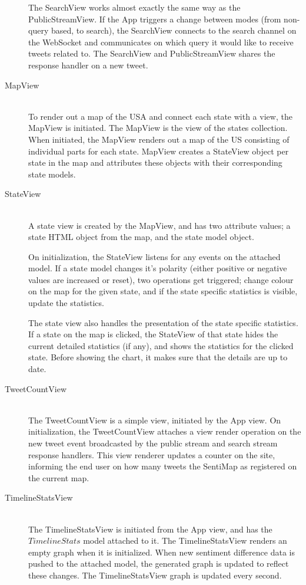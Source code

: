 \begin{description}
The SearchView works almost exactly the same way as the PublicStreamView. If the App triggers a change between modes (from non-query based, to search), the SearchView connects to the search channel on the WebSocket and communicates on which query it would like to receive tweets related to. The SearchView and PublicStreamView shares the response handler on a new tweet.

\item[MapView] \hfill \\

To render out a map of the USA and connect each state with a view, the MapView is initiated. The MapView is the view of the states collection. When initiated, the MapView renders out a map of the US consisting of individual parts for each state. MapView creates a StateView object per state in the map and attributes these objects with their corresponding state models.

\item[StateView] \hfill \\

A state view is created by the MapView, and has two attribute values; a state HTML object from the map, and the state model object. 

On initialization, the StateView listens for any events on the attached model. If a state model changes it's polarity (either positive or negative values are increased or reset), two operations get triggered; change colour on the map for the given state, and if the state specific statistics is visible, update the statistics.

The state view also handles the presentation of the state specific statistics. If a state on the map is clicked, the StateView of that state hides the current detailed statistics (if any), and shows the statistics for the clicked state. Before showing the chart, it makes sure that the details are up to date. 

\item[TweetCountView] \hfill \\

The TweetCountView is a simple view, initiated by the App view. On initialization, the TweetCountView attaches a view render operation on the new tweet event broadcasted by the public stream and search stream response handlers. This view renderer updates a counter on the site, informing the end user on how many tweets the SentiMap as registered on the current map. 

\item[TimelineStatsView] \hfill \\

The TimelineStatsView is initiated from the App view, and has the $TimelineStats$ model attached to it. The TimelineStatsView renders an empty graph when it is initialized. When new sentiment difference data is pushed to the attached model, the generated graph is updated to reflect these changes. The TimelineStatsView graph is updated every second. 

\end{description}

